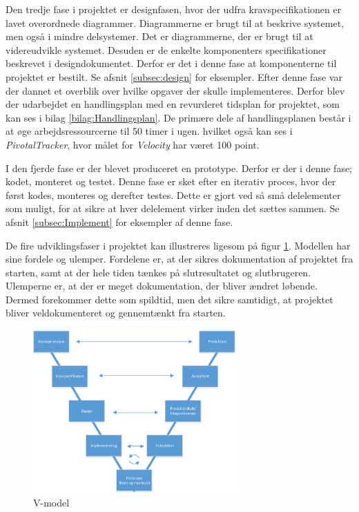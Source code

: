Den tredje fase i projektet er designfasen, hvor der udfra kravspecifikationen er lavet overordnede diagrammer. Diagrammerne er brugt til at beskrive systemet, men også i mindre delsystemer. Det er diagrammerne, der er brugt til at videreudvikle systemet. Desuden er de enkelte komponenters specifikationer beskrevet i designdokumentet. Derfor er det i denne fase at komponenterne til projektet er bestilt. Se afsnit \ref{subsec:design} for eksempler. Efter denne fase var der dannet et overblik over hvilke opgaver der skulle implementeres. Derfor blev der udarbejdet en handlingsplan med en revurderet tidsplan for projektet, som kan ses i bilag \ref{bilag:Handlingsplan}. De primære dele af handlingsplanen består i at øge arbejdsressourcerne til 50 timer i ugen. hvilket også kan ses i \textit{PivotalTracker}, hvor målet for \textit{Velocity} har været 100 point. 

I den fjerde fase er der blevet produceret en prototype. Derfor er der i denne fase; kodet, monteret og testet. Denne fase er sket efter en iterativ proces, hvor der først kodes, monteres og derefter testes. Dette er gjort ved så små delelementer som muligt, for at sikre at hver delelement virker inden det sættes sammen. Se afsnit \ref{subsec:Implement} for eksempler af denne fase. 

De fire udviklingsfaser i projektet kan illustreres ligesom på figur \ref{fig:v-model}. Modellen har sine fordele og ulemper. Fordelene er, at der sikres dokumentation af projektet fra starten, samt at der hele tiden tænkes på slutresultatet og slutbrugeren. Ulemperne er, at der er meget dokumentation, der bliver ændret løbende. Dermed forekommer dette som spildtid, men det sikre samtidigt, at projektet bliver veldokumenteret og gennemtænkt fra starten.

\begin{figure}[H]
	\centering
	\includegraphics[width=0.7\textwidth]{billeder/Hovedrapport/V-model.PDF}
	\caption{V-model}
	\label{fig:v-model}
\end{figure}

